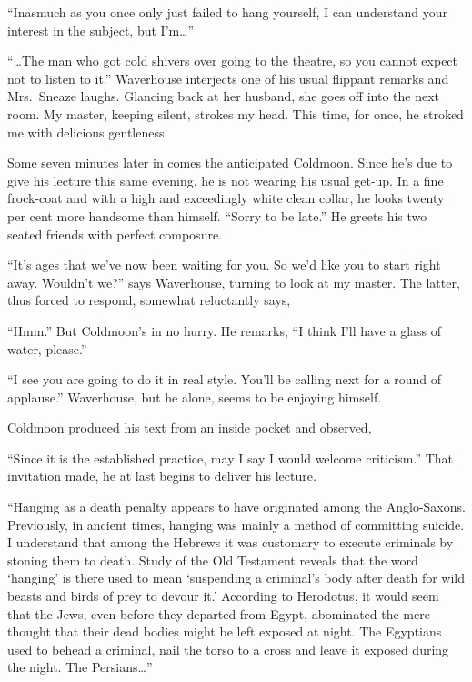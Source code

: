 \documentclass{book}
\begin{document}
``Inasmuch as you once only just failed to hang yourself, I can
understand your interest in the subject, but I'm\ldots{}''

``\ldots{}The man who got cold shivers over going to the theatre, so you
cannot expect not to listen to it.'' Waverhouse interjects one of his
usual flippant remarks and Mrs.~Sneaze laughs. Glancing back at her
husband, she goes off into the next room. My master, keeping silent,
strokes my head. This time, for once, he stroked me with delicious
gentleness.

Some seven minutes later in comes the anticipated Coldmoon. Since he's
due to give his lecture this same evening, he is not wearing his usual
get-up. In a fine frock-coat and with a high and exceedingly white clean
collar, he looks twenty per cent more handsome than himself. ``Sorry to
be late.'' He greets his two seated friends with perfect composure.

``It's ages that we've now been waiting for you. So we'd like you to
start right away. Wouldn't we?'' says Waverhouse, turning to look at my
master. The latter, thus forced to respond, somewhat reluctantly says,

``Hmm.'' But Coldmoon's in no hurry. He remarks, ``I think I'll have a
glass of water, please.''

``I see you are going to do it in real style. You'll be calling next for
a round of applause.'' Waverhouse, but he alone, seems to be enjoying
himself.

Coldmoon produced his text from an inside pocket and observed,

``Since it is the established practice, may I say I would welcome
criticism.'' That invitation made, he at last begins to deliver his
lecture.

``Hanging as a death penalty appears to have originated among the
Anglo-Saxons. Previously, in ancient times, hanging was mainly a method
of committing suicide. I understand that among the Hebrews it was
customary to execute criminals by stoning them to death. Study of the
Old Testament reveals that the word `hanging' is there used to mean
`suspending a criminal's body after death for wild beasts and birds of
prey to devour it.' According to Herodotus, it would seem that the Jews,
even before they departed from Egypt, abominated the mere thought that
their dead bodies might be left exposed at night. The Egyptians used to
behead a criminal, nail the torso to a cross and leave it exposed during
the night. The Persians\ldots{}''
\end{document}
